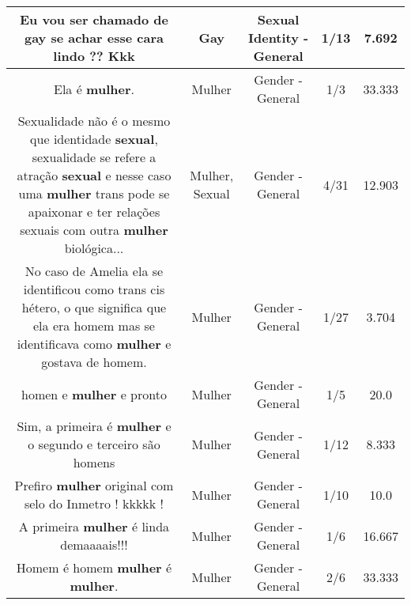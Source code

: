 \documentclass[11pt]{article}
\newlength\mylength
\begin{document}
\begin{center}
\begin{longtable}{|C{.65\mylength}|C{.30\mylength}|C{.12\mylength}|C{.12\mylength}|C{.12\mylength}|}
  \small Eu vou ser chamado de \textbf{gay} se achar esse cara lindo ?? Kkk\normalsize   & Gay & Sexual Identity - General & 1/13 & 7.692 \\  \hline
  \small Ela é \textbf{mulher}.\normalsize   & Mulher & Gender - General & 1/3 & 33.333 \\  \hline
  \small Sexualidade não é o mesmo que identidade \textbf{sexual}, sexualidade se refere a atração \textbf{sexual} e nesse caso uma \textbf{mulher} trans pode se apaixonar e ter relações sexuais com outra \textbf{mulher} biológica...\normalsize   & Mulher, Sexual & Gender - General & 4/31 & 12.903 \\  \hline
  \small No caso de Amelia ela se identificou como trans cis hétero, o que significa que ela era homem mas se identificava como \textbf{mulher} e gostava de homem.\normalsize   & Mulher & Gender - General & 1/27 & 3.704 \\  \hline
  \small homen e \textbf{mulher} e pronto\normalsize   & Mulher & Gender - General & 1/5 & 20.0 \\  \hline
  \small Sim, a primeira é \textbf{mulher} e  o segundo e terceiro são homens\normalsize   & Mulher & Gender - General & 1/12 & 8.333 \\  \hline
  \small Prefiro \textbf{mulher} original com selo do Inmetro !  kkkkk !\normalsize   & Mulher & Gender - General & 1/10 & 10.0 \\  \hline
  \small A primeira \textbf{mulher} é linda demaaaais!!!\normalsize   & Mulher & Gender - General & 1/6 & 16.667 \\  \hline
  \small Homem é homem \textbf{mulher} é \textbf{mulher}.\normalsize   & Mulher & Gender - General & 2/6 & 33.333 \\  \hline

\end{longtable}
\end{center}
\end{document}

